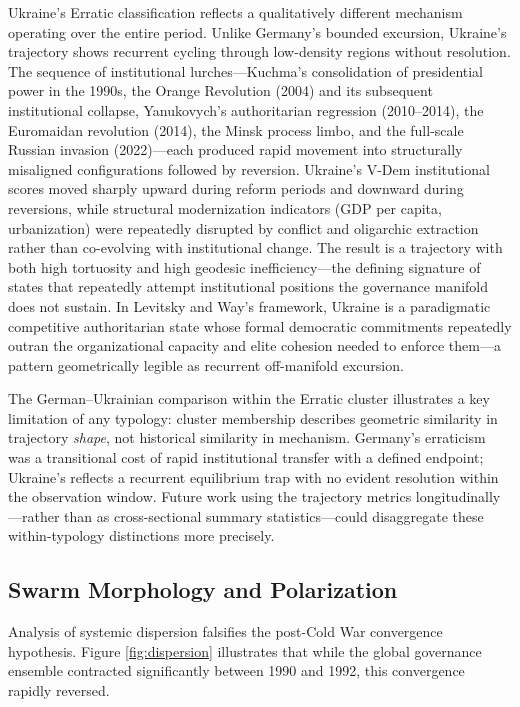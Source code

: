 \documentclass[12pt]{article}
\begin{document}
Ukraine's Erratic classification reflects a qualitatively different mechanism operating over the entire period. Unlike Germany's bounded excursion, Ukraine's trajectory shows recurrent cycling through low-density regions without resolution. The sequence of institutional lurches---Kuchma's consolidation of presidential power in the 1990s, the Orange Revolution (2004) and its subsequent institutional collapse, Yanukovych's authoritarian regression (2010--2014), the Euromaidan revolution (2014), the Minsk process limbo, and the full-scale Russian invasion (2022)---each produced rapid movement into structurally misaligned configurations followed by reversion. Ukraine's V-Dem institutional scores moved sharply upward during reform periods and downward during reversions, while structural modernization indicators (GDP per capita, urbanization) were repeatedly disrupted by conflict and oligarchic extraction rather than co-evolving with institutional change. The result is a trajectory with both high tortuosity and high geodesic inefficiency---the defining signature of states that repeatedly attempt institutional positions the governance manifold does not sustain. In Levitsky and Way's \cite{levitskyway2010} framework, Ukraine is a paradigmatic competitive authoritarian state whose formal democratic commitments repeatedly outran the organizational capacity and elite cohesion needed to enforce them---a pattern geometrically legible as recurrent off-manifold excursion.

The German--Ukrainian comparison within the Erratic cluster illustrates a key limitation of any typology: cluster membership describes geometric similarity in trajectory \textit{shape}, not historical similarity in mechanism. Germany's erraticism was a transitional cost of rapid institutional transfer with a defined endpoint; Ukraine's reflects a recurrent equilibrium trap with no evident resolution within the observation window. Future work using the trajectory metrics longitudinally---rather than as cross-sectional summary statistics---could disaggregate these within-typology distinctions more precisely.

\subsection{Swarm Morphology and Polarization}
Analysis of systemic dispersion falsifies the post-Cold War convergence hypothesis. Figure \ref{fig:dispersion} illustrates that while the global governance ensemble contracted significantly between 1990 and 1992, this convergence rapidly reversed.
\end{document}

